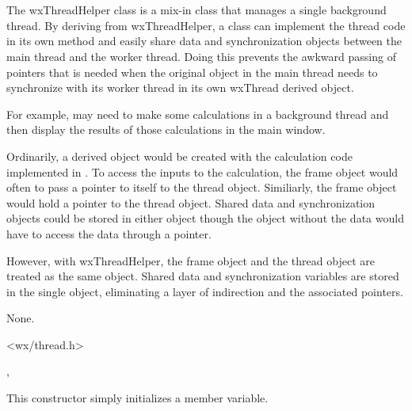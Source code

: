 \section{}\label{wxthreadhelper}

The wxThreadHelper class is a mix-in class that manages a single background
thread.  By deriving from wxThreadHelper, a class can implement the thread
code in its own  method
and easily share data and synchronization objects between the main thread
and the worker thread.  Doing this prevents the awkward passing of pointers
that is needed when the original object in the main thread needs to
synchronize with its worker thread in its own wxThread derived object.

For example,  may need to make some calculations
in a background thread and then display the results of those calculations in
the main window.

Ordinarily, a  derived object would be created
with the calculation code implemented in
.  To access the inputs to the
calculation, the frame object would often to pass a pointer to itself to the
thread object.  Similiarly, the frame object would hold a pointer to the
thread object.  Shared data and synchronization objects could be stored in
either object though the object without the data would have to access the
data through a pointer.

However, with wxThreadHelper, the frame object and the thread object are
treated as the same object.  Shared data and synchronization variables are
stored in the single object, eliminating a layer of indirection and the
associated pointers.


None.


<wx/thread.h>


, 


\label{wxthreadhelperctor}


This constructor simply initializes a member variable.


